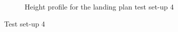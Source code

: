 \begin{figure}[H]
\begin{subfigure}{0.7\textwidth}
\caption{Height profile for the landing plan test set-up 4}
\label{Fig:Height31mai131844}
\end{subfigure}
\caption{Test set-up 4}
\label{Fig:Test4}
\end{figure}

